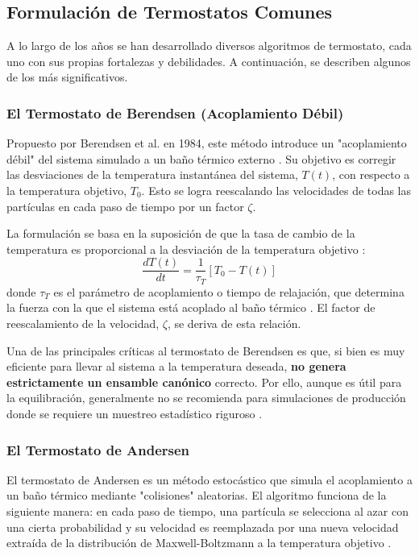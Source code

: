 \subsection{Formulación de Termostatos Comunes}

A lo largo de los años se han desarrollado diversos algoritmos de termostato, cada uno con sus propias fortalezas y debilidades. A continuación, se describen algunos de los más significativos.

\subsubsection{El Termostato de Berendsen (Acoplamiento Débil)}
Propuesto por Berendsen et al. en 1984, este método introduce un "acoplamiento débil" del sistema simulado a un baño térmico externo \cite[102]{zhou2022molecular}. Su objetivo es corregir las desviaciones de la temperatura instantánea del sistema, $T(t)$, con respecto a la temperatura objetivo, $T_0$. Esto se logra reescalando las velocidades de todas las partículas en cada paso de tiempo por un factor $\zeta$.

La formulación se basa en la suposición de que la tasa de cambio de la temperatura es proporcional a la desviación de la temperatura objetivo \cite[102]{zhou2022molecular}:
\begin{equation}
\frac{dT(t)}{dt} = \frac{1}{\tau_T} [T_0 - T(t)]
\end{equation}
donde $\tau_T$ es el parámetro de acoplamiento o tiempo de relajación, que determina la fuerza con la que el sistema está acoplado al baño térmico \cite[102]{zhou2022molecular}. El factor de reescalamiento de la velocidad, $\zeta$, se deriva de esta relación.

Una de las principales críticas al termostato de Berendsen es que, si bien es muy eficiente para llevar al sistema a la temperatura deseada, \textbf{no genera estrictamente un ensamble canónico} correcto. Por ello, aunque es útil para la equilibración, generalmente no se recomienda para simulaciones de producción donde se requiere un muestreo estadístico riguroso \cite[104]{zhou2022molecular}.

\subsubsection{El Termostato de Andersen}
El termostato de Andersen es un método estocástico que simula el acoplamiento a un baño térmico mediante "colisiones" aleatorias. El algoritmo funciona de la siguiente manera: en cada paso de tiempo, una partícula se selecciona al azar con una cierta probabilidad y su velocidad es reemplazada por una nueva velocidad extraída de la distribución de Maxwell-Boltzmann a la temperatura objetivo \cite[758]{frenkel2002understanding}.

